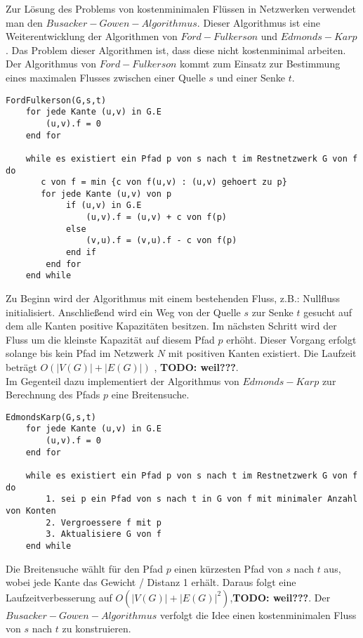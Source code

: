 Zur Lösung des Problems von kostenminimalen Flüssen in Netzwerken verwendet
man den $Busacker-Gowen-Algorithmus$. Dieser Algorithmus ist eine 
Weiterentwicklung der Algorithmen von $Ford-Fulkerson$ und $Edmonds-Karp$. 
Das Problem dieser Algorithmen ist, dass diese nicht kostenminimal arbeiten. 
Der Algorithmus von $Ford-Fulkerson$ kommt zum Einsatz zur Bestimmung eines 
maximalen Flusses zwischen einer Quelle $s$ und einer Senke $t$. 

\begin{lstlisting}
FordFulkerson(G,s,t)
    for jede Kante (u,v) in G.E 
        (u,v).f = 0
    end for
    
    while es existiert ein Pfad p von s nach t im Restnetzwerk G von f do
       c von f = min {c von f(u,v) : (u,v) gehoert zu p}
       for jede Kante (u,v) von p
            if (u,v) in G.E
                (u,v).f = (u,v) + c von f(p)
            else
                (v,u).f = (v,u).f - c von f(p)
            end if
        end for
    end while
\end{lstlisting}

Zu Beginn wird der Algorithmus mit einem bestehenden Fluss, z.B.: Nullfluss 
initialisiert. Anschließend wird ein Weg von der Quelle $s$ zur Senke $t$ 
gesucht auf dem alle Kanten positive Kapazitäten besitzen. Im nächsten 
Schritt wird der Fluss um die kleinste Kapazität auf diesem Pfad $p$
erhöht. Dieser Vorgang erfolgt solange bis kein Pfad im Netzwerk $N$ mit 
positiven Kanten existiert. Die Laufzeit beträgt $O(|V(G)| + |E(G)|)$ ,
\textbf{TODO: weil???}. \cite{algo, optiv}\\

Im Gegenteil dazu implementiert der Algorithmus von $Edmonds-Karp$ zur 
Berechnung des Pfads $p$ eine Breitensuche. 

\begin{lstlisting}
EdmondsKarp(G,s,t)
    for jede Kante (u,v) in G.E 
        (u,v).f = 0
    end for
    
    while es existiert ein Pfad p von s nach t im Restnetzwerk G von f do
        1. sei p ein Pfad von s nach t in G von f mit minimaler Anzahl von Konten
        2. Vergroessere f mit p
        3. Aktualisiere G von f
    end while
\end{lstlisting}

Die Breitensuche wählt für den 
Pfad $p$ einen kürzesten Pfad von $s$ nach $t$ aus, wobei jede Kante das 
Gewicht / Distanz 1 erhält. Daraus folgt eine Laufzeitverbesserung auf 
$O(|V(G)| + |E(G)|^2)$,\textbf{TODO: weil???}. \cite{algo, optiv, edmkarp} Der 
$Busacker-Gowen-Algorithmus$ verfolgt die Idee einen kostenminimalen 
Fluss von $s$ nach $t$ zu konstruieren. 

